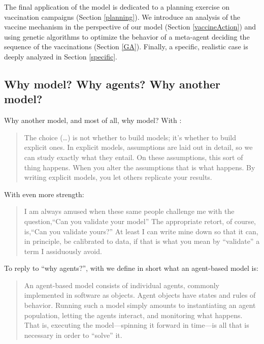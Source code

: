 \documentclass[graybox]{svmult}
\begin{document}
The final application of the model is dedicated to a planning exercise on vaccination campaigns (Section \ref{planning}). We introduce an analysis of the vaccine mechanism in the perspective of our model (Section \ref{vaccineAction}) and using genetic algorithms to optimize the behavior of a meta-agent deciding the sequence of the vaccinations (Section \ref{GA}). Finally, a specific, realistic case is deeply analyzed in Section \ref{specific}.


\subsection{Why model? Why agents? Why another model?}
\label{why}

Why another model, and most of all, why model? With \cite{epstein2008model}:
\begin{quote}
The choice (\ldots) is not whether to build models; it's whether to build explicit ones. In explicit models, assumptions are laid out in detail, so we can study exactly what they entail. On these assumptions, this sort of thing happens. When you alter the assumptions that is what happens. By writing explicit models, you let others replicate your results.
\end{quote}

With even more strength:
\begin{quote} 
I am always amused when these same people challenge me with the question,``Can you validate your model'' The appropriate retort, of course, is,``Can you validate yours?'' At least I can write mine down so that it can, in principle, be calibrated to data, if that is what you mean by ``validate'' a term I assiduously avoid.
\end{quote}

To reply to ``why agents?'', with \cite{axtell2000agents} we define in short what an agent-based model is:
\begin{quote} 
An agent-based model consists of individual agents, commonly implemented in software as objects. Agent objects have states and rules of behavior. Running such a model simply amounts to instantiating an agent population, letting the agents interact, and monitoring what happens. That is, executing the model---spinning it forward in time---is all that is necessary in order to ``solve'' it.
\end{quote}
\end{document}
